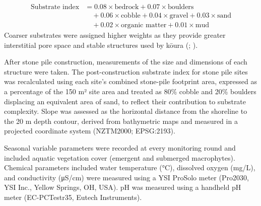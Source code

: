 \documentclass[
  letterpaper,
  DIV=11,
  numbers=noendperiod]{scrartcl}
\begin{document}
\[
\begin{aligned}
\text{Substrate index} &= 0.08 \times \text{bedrock} + 0.07 \times \text{boulders} \\
&\quad + 0.06 \times \text{cobble} + 0.04 \times \text{gravel} + 0.03 \times \text{sand} \\
&\quad + 0.02 \times \text{organic matter} + 0.01 \times \text{mud}
\end{aligned}
\] Coarser substrates were assigned higher weights as they provide
greater interstitial pore space and stable structures used by kōura
(;
).

After stone pile construction, measurements of the size and dimensions
of each structure were taken. The post-construction substrate index for
stone pile sites was recalculated using each site's combined stone-pile
footprint area, expressed as a percentage of the 150 m² site area and
treated as 80\% cobble and 20\% boulders displacing an equivalent area
of sand, to reflect their contribution to substrate complexity. Slope
was assessed as the horizontal distance from the shoreline to the 20 m
depth contour, derived from bathymetric maps and measured in a projected
coordinate system (NZTM2000; EPSG:2193).

Seasonal variable parameters were recorded at every monitoring round and
included aquatic vegetation cover (emergent and submerged macrophytes).
Chemical parameters included water temperature (°C), dissolved oxygen
(mg/L), and conductivity (μS/cm) were measured using a YSI ProSolo meter
(Pro2030, YSI Inc., Yellow Springs, OH, USA). pH was measured using a
handheld pH meter (EC-PCTestr35, Eutech Instruments).
\end{document}
